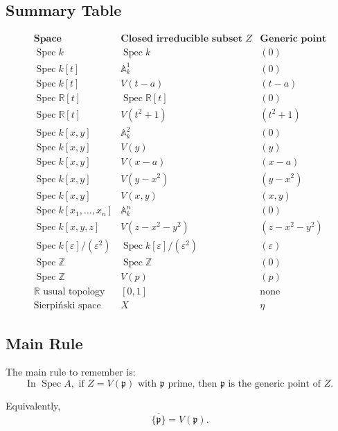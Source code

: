 \documentclass[12pt,a4paper]{article}
\theoremstyle{notespace}
\begin{document}
\subsection{Summary Table}

\[
\begin{array}{c|c|c}
	\textbf{Space}
	&
	\textbf{Closed irreducible subset }Z
	&
	\textbf{Generic point}
	\\
	\hline
	\operatorname{Spec} k
	&
	\operatorname{Spec} k
	&
	(0)
	\\
	\operatorname{Spec} k[t]
	&
	\mathbb A^1_k
	&
	(0)
	\\
	\operatorname{Spec} k[t]
	&
	V(t-a)
	&
	(t-a)
	\\
	\operatorname{Spec}\mathbb R[t]
	&
	\operatorname{Spec}\mathbb R[t]
	&
	(0)
	\\
	\operatorname{Spec}\mathbb R[t]
	&
	V(t^2+1)
	&
	(t^2+1)
	\\
	\operatorname{Spec} k[x,y]
	&
	\mathbb A^2_k
	&
	(0)
	\\
	\operatorname{Spec} k[x,y]
	&
	V(y)
	&
	(y)
	\\
	\operatorname{Spec} k[x,y]
	&
	V(x-a)
	&
	(x-a)
	\\
	\operatorname{Spec} k[x,y]
	&
	V(y-x^2)
	&
	(y-x^2)
	\\
	\operatorname{Spec} k[x,y]
	&
	V(x,y)
	&
	(x,y)
	\\
	\operatorname{Spec} k[x_1,\dots,x_n]
	&
	\mathbb A^n_k
	&
	(0)
	\\
	\operatorname{Spec} k[x,y,z]
	&
	V(z-x^2-y^2)
	&
	(z-x^2-y^2)
	\\
	\operatorname{Spec} k[\varepsilon]/(\varepsilon^2)
	&
	\operatorname{Spec} k[\varepsilon]/(\varepsilon^2)
	&
	(\varepsilon)
	\\
	\operatorname{Spec}\mathbb Z
	&
	\operatorname{Spec}\mathbb Z
	&
	(0)
	\\
	\operatorname{Spec}\mathbb Z
	&
	V(p)
	&
	(p)
	\\
	\mathbb R \text{ usual topology}
	&
	[0,1]
	&
	\text{none}
	\\
	\text{Sierpiński space}
	&
	X
	&
	\eta
\end{array}
\]

\subsection{Main Rule}

The main rule to remember is:
\[
\boxed{
	\text{In }\operatorname{Spec} A,\text{ if }Z=V(\mathfrak p)
	\text{ with }\mathfrak p\text{ prime, then }\mathfrak p
	\text{ is the generic point of }Z.
}
\]

Equivalently,
\[
\boxed{
	\overline{\{\mathfrak p\}}=V(\mathfrak p).
}
\]
\end{document}
